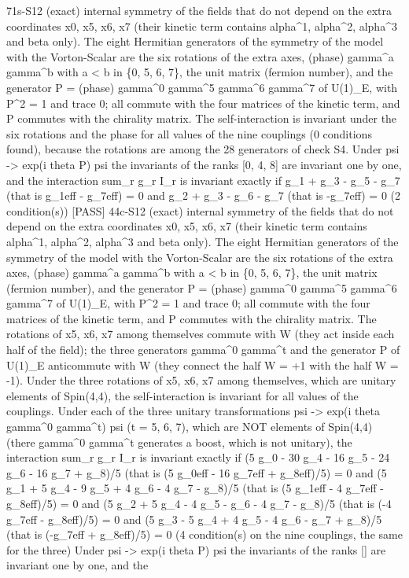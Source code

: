 \documentclass[
  10pt,
]{article}
\newenvironment{Shaded}{}{}
\newcommand{\NormalTok}[1]{#1}
\begin{document}
\begin{Shaded}
\begin{Highlighting}[]
\NormalTok{[PASS] 71s{-}S12  (exact) internal symmetry of the fields that do not depend on the extra coordinates x0, x5, x6, x7 (their kinetic term contains alpha\^{}1, alpha\^{}2, alpha\^{}3 and beta only). The eight Hermitian generators of the symmetry of the model with the Vorton{-}Scalar are the six rotations of the extra axes, (phase) gamma\^{}a gamma\^{}b with a \textless{} b in \{0, 5, 6, 7\}, the unit matrix (fermion number), and the generator P = (phase) gamma\^{}0 gamma\^{}5 gamma\^{}6 gamma\^{}7 of U(1)\_E, with P\^{}2 = 1 and trace 0; all commute with the four matrices of the kinetic term, and P commutes with the chirality matrix. The self{-}interaction is invariant under the six rotations and the phase for all values of the nine couplings (0 conditions found), because the rotations are among the 28 generators of check S4. Under psi {-}\textgreater{} exp(i theta P) psi the invariants of the ranks [0, 4, 8] are invariant one by one, and the interaction sum\_r g\_r I\_r is invariant exactly if g\_1 + g\_3 {-} g\_5 {-} g\_7 (that is g\_1eff {-} g\_7eff) = 0 and g\_2 + g\_3 {-} g\_6 {-} g\_7 (that is {-}g\_7eff) = 0 (2 condition(s))}
\NormalTok{[PASS] 44c{-}S12  (exact) internal symmetry of the fields that do not depend on the extra coordinates x0, x5, x6, x7 (their kinetic term contains alpha\^{}1, alpha\^{}2, alpha\^{}3 and beta only). The eight Hermitian generators of the symmetry of the model with the Vorton{-}Scalar are the six rotations of the extra axes, (phase) gamma\^{}a gamma\^{}b with a \textless{} b in \{0, 5, 6, 7\}, the unit matrix (fermion number), and the generator P = (phase) gamma\^{}0 gamma\^{}5 gamma\^{}6 gamma\^{}7 of U(1)\_E, with P\^{}2 = 1 and trace 0; all commute with the four matrices of the kinetic term, and P commutes with the chirality matrix. The rotations of x5, x6, x7 among themselves commute with W (they act inside each half of the field); the three generators gamma\^{}0 gamma\^{}t and the generator P of U(1)\_E anticommute with W (they connect the half W = +1 with the half W = {-}1). Under the three rotations of x5, x6, x7 among themselves, which are unitary elements of Spin(4,4), the self{-}interaction is invariant for all values of the couplings. Under each of the three unitary transformations psi {-}\textgreater{} exp(i theta gamma\^{}0 gamma\^{}t) psi (t = 5, 6, 7), which are NOT elements of Spin(4,4) (there gamma\^{}0 gamma\^{}t generates a boost, which is not unitary), the interaction sum\_r g\_r I\_r is invariant exactly if (5 g\_0 {-} 30 g\_4 {-} 16 g\_5 {-} 24 g\_6 {-} 16 g\_7 + g\_8)/5 (that is (5 g\_0eff {-} 16 g\_7eff + g\_8eff)/5) = 0 and (5 g\_1 + 5 g\_4 {-} 9 g\_5 + 4 g\_6 {-} 4 g\_7 {-} g\_8)/5 (that is (5 g\_1eff {-} 4 g\_7eff {-} g\_8eff)/5) = 0 and (5 g\_2 + 5 g\_4 {-} 4 g\_5 {-} g\_6 {-} 4 g\_7 {-} g\_8)/5 (that is ({-}4 g\_7eff {-} g\_8eff)/5) = 0 and (5 g\_3 {-} 5 g\_4 + 4 g\_5 {-} 4 g\_6 {-} g\_7 + g\_8)/5 (that is ({-}g\_7eff + g\_8eff)/5) = 0 (4 condition(s) on the nine couplings, the same for the three) Under psi {-}\textgreater{} exp(i theta P) psi the invariants of the ranks [] are invariant one by one, and the}

\end{Highlighting}
\end{Shaded}
\end{document}
